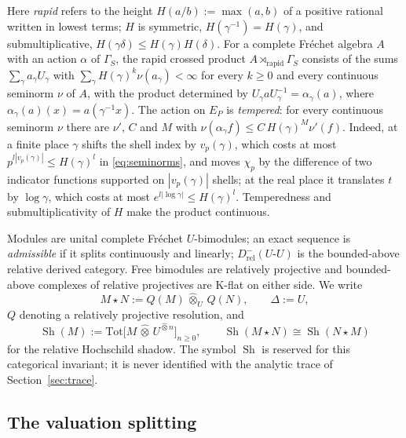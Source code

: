 \documentclass[11pt]{amsart}
\theoremstyle{definition}
\theoremstyle{remark}
\newcommand{\Sh}{\operatorname{Sh}}
\begin{document}
Here \emph{rapid} refers to the height $H(a/b):=\max(a,b)$ of a positive
rational written in lowest terms; $H$ is symmetric,
$H(\gamma^{-1})=H(\gamma)$, and submultiplicative,
$H(\gamma\delta)\le H(\gamma)H(\delta)$.  For a complete Fr\'echet algebra $A$
with an action $\alpha$ of $\Gamma_S$, the rapid crossed product
$A\rtimes_{\mathrm{rapid}}\Gamma_S$ consists of the sums
$\sum_{\gamma}a_{\gamma}U_{\gamma}$ with
$\sum_{\gamma}H(\gamma)^{k}\nu(a_{\gamma})<\infty$ for every $k\ge0$ and every
continuous seminorm $\nu$ of $A$, with the product determined by
$U_{\gamma}aU_{\gamma}^{-1}=\alpha_{\gamma}(a)$, where
$\alpha_{\gamma}(a)(x)=a(\gamma^{-1}x)$.  The action on $E_P$ is
\emph{tempered}: for every continuous seminorm $\nu$ there are $\nu'$, $C$ and
$M$ with $\nu(\alpha_{\gamma}f)\le C\,H(\gamma)^{M}\nu'(f)$.  Indeed, at a
finite place $\gamma$ shifts the shell index by $v_p(\gamma)$, which costs at
most $p^{l|v_p(\gamma)|}\le H(\gamma)^{l}$ in \eqref{eq:seminorms}, and moves
$\chi_p$ by the difference of two indicator functions supported on
$|v_p(\gamma)|$ shells; at the real place it translates $t$ by
$\log\gamma$, which costs at most $e^{l|\log\gamma|}\le H(\gamma)^{l}$.
Temperedness and submultiplicativity of $H$ make the product continuous.

Modules are unital complete Fr\'echet $U$-bimodules; an exact sequence is
\emph{admissible} if it splits continuously and linearly; $D^{-}_{\mathrm{rel}}(U\text{-}U)$
is the bounded-above relative derived category.  Free bimodules are relatively
projective and bounded-above complexes of relative projectives are K-flat on
either side.  We write
\begin{equation}\label{eq:comp}
M\star N:=Q(M)\,\widehat\otimes_U\,Q(N),\qquad \Delta:=U,
\end{equation}
$Q$ denoting a relatively projective resolution, and
\begin{equation}\label{eq:shadow}
\Sh(M):=\mathrm{Tot}\bigl[M\,\widehat\otimes\,U^{\widehat\otimes n}\bigr]_{n\ge0},
\qquad \Sh(M\star N)\cong\Sh(N\star M)
\end{equation}
for the relative Hochschild shadow.  The symbol $\Sh$ is reserved for this
categorical invariant; it is never identified with the analytic trace of
Section~\ref{sec:trace}.

\subsection{The valuation splitting}
\end{document}
